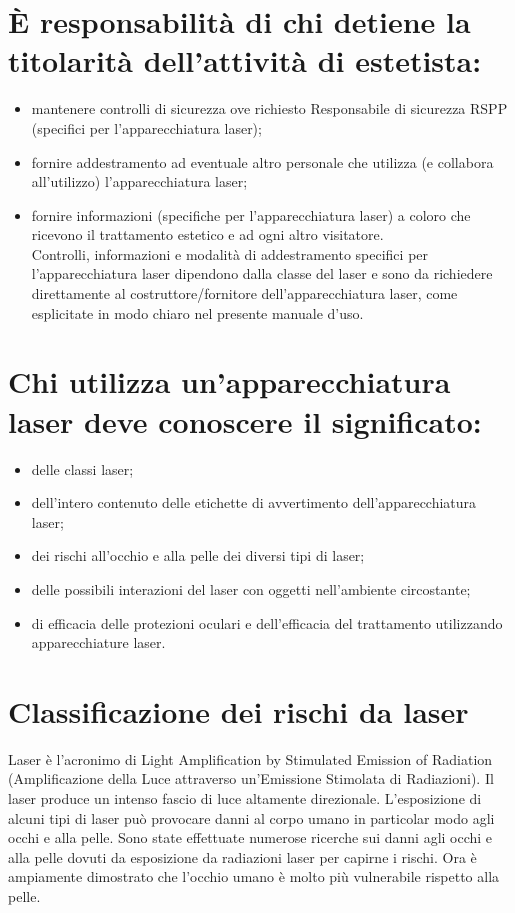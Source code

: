 \documentclass[10pt]{article}
\begin{document}
\section{È responsabilità di chi detiene la titolarità dell'attività di estetista:}
\begin{itemize}
  \item mantenere controlli di sicurezza ove richiesto Responsabile di sicurezza RSPP (specifici per l'apparecchiatura laser);
  \item fornire addestramento ad eventuale altro personale che utilizza (e collabora all'utilizzo) l'apparecchiatura laser;
  \item fornire informazioni (specifiche per l'apparecchiatura laser) a coloro che ricevono il trattamento estetico e ad ogni altro visitatore.\\
Controlli, informazioni e modalità di addestramento specifici per l'apparecchiatura laser dipendono dalla classe del laser e sono da richiedere direttamente al costruttore/fornitore dell'apparecchiatura laser, come esplicitate in modo chiaro nel presente manuale d'uso.
\end{itemize}

\section{Chi utilizza un'apparecchiatura laser deve conoscere il significato:}
\begin{itemize}
  \item delle classi laser;
  \item dell'intero contenuto delle etichette di avvertimento dell'apparecchiatura laser;
  \item dei rischi all'occhio e alla pelle dei diversi tipi di laser;
  \item delle possibili interazioni del laser con oggetti nell'ambiente circostante;
  \item di efficacia delle protezioni oculari e dell'efficacia del trattamento utilizzando apparecchiature laser.
\end{itemize}

\section{Classificazione dei rischi da laser}
Laser è l'acronimo di Light Amplification by Stimulated Emission of Radiation (Amplificazione della Luce attraverso un'Emissione Stimolata di Radiazioni). Il laser produce un intenso fascio di luce altamente direzionale. L'esposizione di alcuni tipi di laser può provocare danni al corpo umano in particolar modo agli occhi e alla pelle. Sono state effettuate numerose ricerche sui danni agli occhi e alla pelle dovuti da esposizione da radiazioni laser per capirne i rischi. Ora è ampiamente dimostrato che l'occhio umano è molto più vulnerabile rispetto alla pelle.
\end{document}
